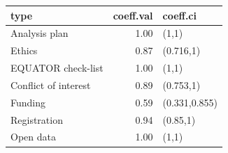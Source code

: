 \begin{table}[ht]
\centering
\begin{tabular}{lrl}
 type & coeff.val & coeff.ci \\ 
  \hline
Analysis plan & 1.00 & (1,1) \\ 
  Ethics & 0.87 & (0.716,1) \\ 
  EQUATOR check-list & 1.00 & (1,1) \\ 
  Conflict of interest & 0.89 & (0.753,1) \\ 
  Funding & 0.59 & (0.331,0.855) \\ 
  Registration & 0.94 & (0.85,1) \\ 
  Open data & 1.00 & (1,1) \\ 
  \end{tabular}
\end{table}
